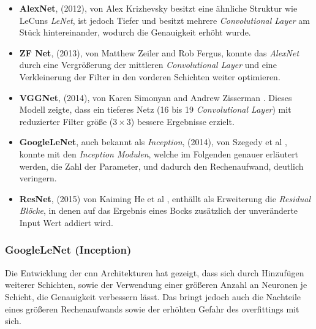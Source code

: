 \begin{itemize}
    \item \textbf{AlexNet}, (2012), von Alex Krizhevsky 
        \cite{krizhevskyImageNetClassificationDeep2017b} besitzt eine 
        ähnliche Struktur wie LeCuns \textit{LeNet},
        ist jedoch Tiefer und besitzt mehrere \textit{Convolutional
         Layer} am Stück hintereinander,
        wodurch die Genauigkeit erhöht wurde.

    \item \textbf{ZF Net}, (2013), von Matthew Zeiler and Rob Fergus,
        \cite{zeilerVisualizingUnderstandingConvolutional2013}
        konnte das \textit{AlexNet} durch eine Vergrößerung der 
        mittleren \textit{Convolutional Layer}
        und eine Verkleinerung der Filter in den vorderen
        Schichten weiter optimieren.

    \item \textbf{VGGNet}, (2014), von Karen Simonyan and Andrew Zisserman
        \cite{simonyanVeryDeepConvolutional2015}.
        Dieses Modell zeigte, dass ein tieferes Netz
         (16 bis 19 \textit{Convolutional Layer})
        mit reduzierter Filter größe ($3\times3$) bessere
        Ergebnisse erzielt.    

    \item \textbf{GoogleLeNet}, auch bekannt als \textit{Inception}, (2014),
        von Szegedy et al \cite{szegedyGoingDeeperConvolutions2014},
        konnte mit den \textit{Inception Modulen},
        welche im Folgenden genauer erläutert werden, die Zahl der 
        Parameter, und dadurch den Rechenaufwand, deutlich veringern.

    \item \textbf{ResNet}, (2015) von Kaiming He et al 
        \cite{heDeepResidualLearning2015}, enthällt 
        als Erweiterung die \textit{Residual Blöcke}, in denen auf
        das Ergebnis eines Bocks zusätzlich der unveränderte
        Input Wert addiert wird.
\end{itemize}



\subsubsection{GoogleLeNet (Inception)}

Die Entwicklung der \Gls{cnn} Architekturen hat gezeigt,
dass sich durch Hinzufügen weiterer Schichten, sowie
der Verwendung einer größeren Anzahl an Neuronen je Schicht, 
die Genauigkeit verbessern lässt.
Das bringt jedoch auch die Nachteile eines 
größeren Rechenaufwands sowie der erhöhten 
Gefahr des \Glspl{overfitting} mit sich.

